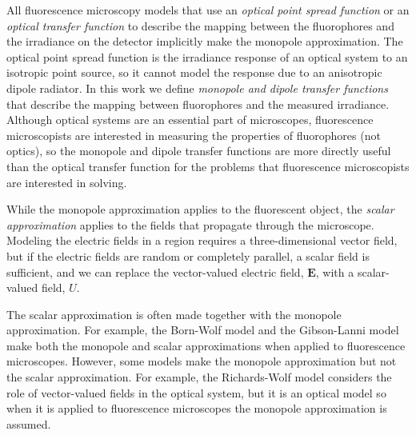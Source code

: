 \documentclass[]{osa-article}
\providecommand{\mb}[1]{\mathbf{#1}}
\begin{document}

All fluorescence microscopy models that use an \textit{optical point spread
  function} or an \textit{optical transfer function} to describe the mapping
between the fluorophores and the irradiance on the detector implicitly make the
monopole approximation. The optical point spread function is the irradiance
response of an optical system to an isotropic point source, so it cannot model
the response due to an anisotropic dipole radiator. In this work we define
\textit{monopole and dipole transfer functions} that describe the mapping
between fluorophores and the measured irradiance. Although optical systems are
an essential part of microscopes, fluorescence microscopists are interested in
measuring the properties of fluorophores (not optics), so the monopole and
dipole transfer functions are more directly useful than the optical transfer
function for the problems that fluorescence microscopists are interested in
solving.

While the monopole approximation applies to the fluorescent object, the
\textit{scalar approximation} applies to the fields that propagate through the
microscope. Modeling the electric fields in a region requires a
three-dimensional vector field, but if the electric fields are random or
completely parallel, a scalar field is sufficient, and we can replace the
vector-valued electric field, $\mb{E}$, with a scalar-valued field, $U$.

The scalar approximation is often made together with the monopole approximation.
For example, the Born-Wolf model \cite{born1980} and the Gibson-Lanni model
\cite{gibson89} make both the monopole and scalar approximations when applied to
fluorescence microscopes. However, some models make the monopole approximation
but not the scalar approximation. For example, the Richards-Wolf model
\cite{richards} considers the role of vector-valued fields in the optical
system, but it is an optical model so when it is applied to fluorescence
microscopes the monopole approximation is assumed. 
\end{document}
